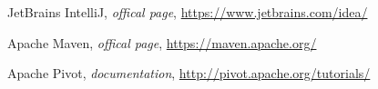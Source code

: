 \begin{thebibliography}{99999}
\singlespace\normalsize

 JetBrains IntelliJ, \textit{offical page}, \url{https://www.jetbrains.com/idea/}

 Apache Maven, \textit{offical page}, \url{https://maven.apache.org/}

 Apache Pivot, \textit{documentation}, \url{http://pivot.apache.org/tutorials/}

\end{thebibliography}
